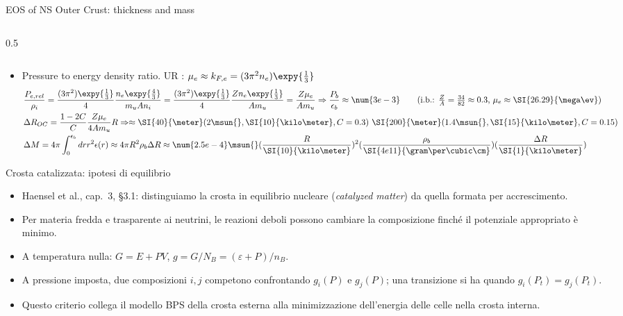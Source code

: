 \begin{frame}{EOS of NS Outer Crust: thickness and mass}
\begin{columns}[T]
\begin{column}{0.5\textwidth}
        \end{column}
    \end{columns}
    \begin{itemize}
        \item Pressure to energy density ratio. UR \Pelectron: $\mu_e\approx k_{F,e}=(3\pi^2n_e)\expy{\frac{1}{3}}$
            \begin{align*}
                &\frac{P_{e,rel}}{\rho_i}=\frac{(3\pi^2)\expy{\frac{1}{3}}}{4}\frac{n_e\expy{\frac{4}{3}}}{m_uAn_i}=\frac{(3\pi^2)\expy{\frac{1}{3}}}{4}\frac{Zn_e\expy{\frac{1}{3}}}{Am_u}=\frac{Z\mu_e}{Am_u}\Rightarrow \frac{P_b}{\epsilon_b}\approx\num{3e-3}\tag{i.b.: $\frac{Z}{A}=\frac{34}{82}\approx0.3$, $\mu_e\approx\SI{26.29}{\mega\ev}$}\\
                &\Delta R_{OC}=\frac{1-2C}{C}\frac{Z\mu_e}{4Am_u} R\Rightarrow \approx \SI{40}{\meter} (2\msun{}, \SI{10}{\kilo\meter}, C=0.3)\ \SI{200}{\meter} (1.4\msun{}, \SI{15}{\kilo\meter}, C=0.15)\\
                &\Delta M=4\pi\int_0^{\epsilon_b}drr^2\epsilon(r)\approx 4\pi R^2\rho_b\Delta R\approx\num{2.5e-4}\msun{}(\frac{R}{\SI{10}{\kilo\meter}})^2(\frac{\rho_b}{\SI{4e11}{\gram\per\cubic\cm}})(\frac{\Delta R}{\SI{1}{\kilo\meter}})
            \end{align*}
    \end{itemize}
\end{frame}

\begin{frame}[t]{Crosta catalizzata: ipotesi di equilibrio}
\small
\begin{itemize}
\item Haensel et al., cap.~3, \S3.1: distinguiamo la crosta in equilibrio nucleare (\emph{catalyzed matter}) da quella formata per accrescimento.
\item Per materia fredda e trasparente ai neutrini, le reazioni deboli possono cambiare la composizione finché il potenziale appropriato è minimo.
\item A temperatura nulla: \(G=E+PV\), \(g=G/N_B=(\varepsilon+P)/n_B\).
\item A pressione imposta, due composizioni \(i,j\) competono confrontando \(g_i(P)\) e \(g_j(P)\); una transizione si ha quando \(g_i(P_t)=g_j(P_t)\).
\item Questo criterio collega il modello BPS della crosta esterna alla minimizzazione dell'energia delle celle nella crosta interna.
\end{itemize}
\end{frame}

